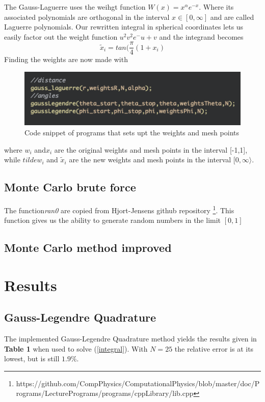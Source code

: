 \documentclass[twoside,twocolumn]{article}
\begin{document}
The Gauss-Laguerre uses the weihgt function $W(x)  = x^\alpha e^{-x}$. Where its associated polynomials are orthogonal in the interval $x\in[0,\infty]$ and are called Laguerre polynomials. Our rewritten integral in spherical coordinates lets us easily factor out the weight function $u^2v^2 e^-{u+v}$ and the integrand becomes
\begin{equation}
	\tilde{x}_i = tan(\frac{\pi}{4}(1+x_i)
\end{equation}
Finding the weights are now made with 
\begin{figure}[h]
\center
\includegraphics[scale=0.55]{Laguerre.png}
\caption{Code snippet of programs that sets upt the weights and mesh points}
\end{figure}


where $w_i$ and$x_i$ are the original weights and mesh points in the interval [-1,1], while $tilde{w}_i$ and $\tilde{x}_i$ are the new weights and mesh points in the interval $[0,\infty\rangle$.

\subsection{Monte Carlo brute force}
The function\textit{ran0}  are copied from Hjort-Jensens github repository \footnote{https://github.com/CompPhysics/ComputationalPhysics/blob/master/doc/Programs/LecturePrograms/programs/cppLibrary/lib.cpp}. This function gives us the ability to generate random numbers in the limit $[0,1]$
\subsection{Monte Carlo method improved}




\section{Results}


\subsection{Gauss-Legendre Quadrature}
The implemented Gauss-Legendre Quadrature method yields the results given in \textbf{Table 1} when used to solve (\ref{integral}). With $N=25$ the relative error is at its lowest, but is still $1.9 \%$. 
\end{document}
